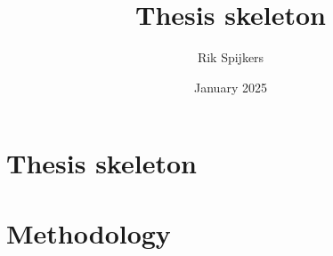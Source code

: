 \documentclass{article}
\title{Thesis skeleton}
\author{Rik Spijkers}
\date{January 2025}
\begin{document}

\section*{Thesis skeleton}
% 
\section*{Methodology}


\end{document}

